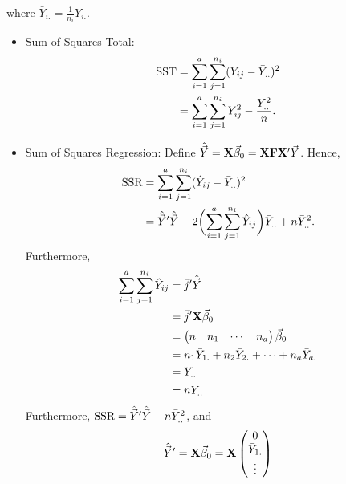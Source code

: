 where $ \bar{Y}_{i.}=\frac{1}{n_i}Y_{i.} $.
\begin{itemize}
    \item Sum of Squares Total:
          \begin{align*}
              \text{SST}
               & =\sum_{i=1}^{a}\sum_{j=1}^{n_i}(Y_{ij}-\bar{Y}_{..})^2      \\
               & =\sum_{i=1}^{a}\sum_{j=1}^{n_i}Y_{ij}^2-\frac{Y_{..}^2}{n}.
          \end{align*}
    \item Sum of Squares Regression: Define $ \hat{\vec{Y}}=\mathbf{X}\vec{\beta}_0=
              \mathbf{X}\mathbf{F}\mathbf{X}'\vec{Y} $. Hence,
          \begin{align*}
              \text{SSR}
               & =\sum_{i=1}^{a}\sum_{j=1}^{n_i}(\hat{Y}_{ij}-\bar{Y}_{..})^2                                                              \\
               & =\hat{\vec{Y}}'\hat{\vec{Y}}-2\biggl(\sum_{i=1}^{a}\sum_{j=1}^{n_i}\hat{Y}_{ij}\biggr)\bar{Y}_{..}+n\bar{Y}_{..}^2.
          \end{align*}
          Furthermore,
          \begin{align*}
              \sum_{i=1}^{a}\sum_{j=1}^{n_i}\hat{Y}_{ij}
               & =\vec{j}'\hat{\vec{Y}}                             \\
               & =\vec{j}'\mathbf{X}\vec{\beta}_0                   \\
               & =\begin{pmatrix}
                      n & n_1 & \cdots & n_a
                  \end{pmatrix}\vec{\beta}_0                           \\
               & =n_1 \bar{Y}_{1.}+n_2\bar{Y}_{2.}+\cdots+n_a\bar{Y}_{a.} \\
               & =Y_{..}                                                  \\
               & =n\bar{Y}_{..}
          \end{align*}
          Furthermore, $ \text{SSR}=\hat{\vec{Y}}'\hat{\vec{Y}}-n\bar{Y}_{..}^2 $, and
          \[ \hat{\vec{Y}}'=\mathbf{X}\vec{\beta}_0=
              \mathbf{X}\begin{pmatrix}
                  0            \\
                  \bar{Y}_{1.} \\
                  \vdots       \\

\end{pmatrix}\]
\end{itemize}
